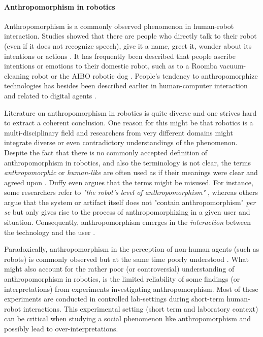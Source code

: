 \documentclass{acm_proc_article-sp}
\begin{document}
\paragraph{Anthropomorphism in robotics}

Anthropomorphism is a commonly observed phenomenon in human-robot interaction.
Studies showed that there are people who directly talk to their robot (even if
it does not recognize speech), give it a name, greet it, wonder about its
intentions or actions
\cite{eyssel_anthropomorphic_2010,fink_anthropomorphic_2012,forlizzi_how_2007,fussell_how_2008,kiesler_anthropomorphic_2008}.
It has frequently been described that people ascribe intentions or emotions to
their domestic robot, such as to a Roomba vacuum-cleaning robot
\cite{krumm_my_2007,sung_robots_2009} or the AIBO robotic dog
\cite{friedman_hardware_2003}. People's tendency to anthropomorphize
technologies has besides been described earlier in human-computer interaction
and related to digital agents \cite{reeves_media_1996,
nass_anthropocentrism_1995}. 

Literature on anthropomorphism in robotics is quite diverse and one strives
hard to extract a coherent conclusion. One reason for this might be that
robotics is a multi-disciplinary field and researchers from very different
domains might integrate diverse or even contradictory understandings of the
phenomenon. Despite the fact that there is no commonly accepted definition of
anthropomorphism in robotics, and also the terminology is not clear, the terms
\textit{anthropomorphic} or \textit{human-like} are often used as if their
meanings were clear and agreed upon \cite{persson_anthropomorphism_2000}. Duffy
\cite{duffy_anthropomorphism_2002} even argues that the terms might be misused.
For instance, some researchers refer to \textit{"the robot's level of
anthropomorphism"} \cite{bartneck_is_2007}, whereas others argue that the
system or artifact itself does not "contain anthropomorphism" \textit{per se}
but only gives rise to the process of anthropomorphizing in a given user and
situation. Consequently, anthropomorphism emerges in the \textit{interaction}
between the technology and the user \cite{persson_anthropomorphism_2000}.

Paradoxically, anthropomorphism in the perception of non-human agents (such as
robots) is commonly observed but at the same time poorly understood
\cite{epley_seeing_2007}. What might also account for the rather poor (or
controversial) understanding of anthropomorphism in robotics, is the limited
reliability of some findings (or interpretations) from experiments
investigating anthropomorphism. Most of these experiments are conducted in
controlled lab-settings during short-term human-robot interactions. This
experimental setting (short term and laboratory context) can be critical when
studying a social phenomenon like anthropomorphism and possibly lead to
over-interpretations. 
\end{document}

